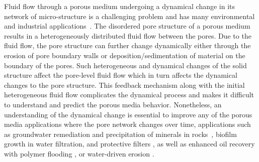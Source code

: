 \documentclass[%
 reprint,
 amsmath,amssymb,
 aps,
]{revtex4-1}
\begin{document}
\maketitle

Fluid flow through a porous medium undergoing a dynamical change in its network of micro-structure is a challenging problem and has many environmental and industrial applications~\cite{fraggedakis2015flow,sahimi2011flow,schlesinger1999carbon,herzig1970flow,tien1979advances,jaisi2008transport,carrel2018biofilms,seymour2004anomalous,duduta2011semi,sun2019hierarchical,marbach2016pruning,tero2010rules,alim2013random,heaton2010growth}.
The disordered pore structure of a porous medium results in a heterogeneously distributed fluid flow between the pores.
Due to the fluid flow, the pore structure can further change dynamically either through the erosion of pore boundary walls or deposition/sedimentation of material on the boundary of the pores. Such heterogeneous and dynamical changes of the solid structure affect the pore-level fluid flow which in turn affects the dynamical changes to the pore structure. This feedback mechanism along with the initial heterogeneous fluid flow complicates the dynamical process and makes it difficult to understand and predict the porous media behavior. Nonetheless, an understanding of the dynamical change is essential to improve any of the porous media applications where the pore network changes over time, applications such as groundwater remediation and precipitation of minerals in rocks~\cite{rad2013pore}, biofilm growth in water filtration, and protective filters \cite{herzig1970flow,tien1979advances,jaisi2008transport,carrel2018biofilms,seymour2004anomalous}, as well as enhanced oil recovery with polymer flooding \cite{lake2014fundamentals,parsa2020origin}, or water-driven erosion \cite{schorghofer2004spontaneous,mahadevan2012flow}. 
\end{document}

